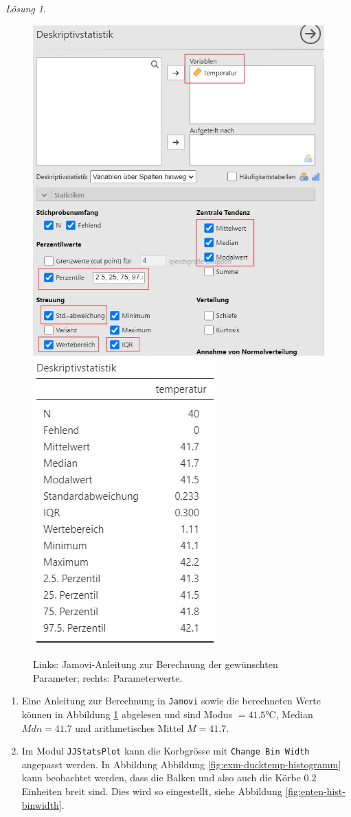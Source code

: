 \documentclass[
]{book}
\providecommand{\tightlist}{%
  \setlength{\itemsep}{0pt}\setlength{\parskip}{0pt}}
\theoremstyle{definition}
\theoremstyle{definition}
\theoremstyle{definition}
\theoremstyle{definition}
\theoremstyle{remark}
\newtheorem*{solution}{Lösung}
\begin{document}
\begin{solution}
\begin{figure}

{\centering \includegraphics[width=0.5\linewidth]{figures/02-exr-enten-hist-mean-sd-input} \includegraphics[width=0.5\linewidth]{figures/02-exr-enten-hist-mean-sd-output} 

}

\caption{Links: Jamovi-Anleitung zur Berechnung der gewünschten Parameter; rechts: Parameterwerte.}\label{fig:enten-hist-mean-sd2}
\end{figure}

\begin{enumerate}
\def\labelenumi{(\alph{enumi})}
\setcounter{enumi}{1}
\tightlist
\item
  Eine Anleitung zur Berechnung in \texttt{Jamovi} sowie die berechneten Werte können in Abbildung \ref{fig:enten-hist-mean-sd2} abgelesen und sind Modus \(= 41.5\)°C, Median \(Mdn = 41.7\) und arithmetisches Mittel \(M=41.7\).
\item
  Im Modul \texttt{JJStatsPlot} kann die Korbgrösse mit \texttt{Change\ Bin\ Width} angepasst werden. In Abbildung Abbildung \ref{fig:exm-ducktemp-histogramm} kann beobachtet werden, dass die Balken und also auch die Körbe \(0.2\) Einheiten breit sind. Dies wird so eingestellt, siehe Abbildung \ref{fig:enten-hist-binwidth}.
\end{enumerate}


\end{solution}
\end{document}
